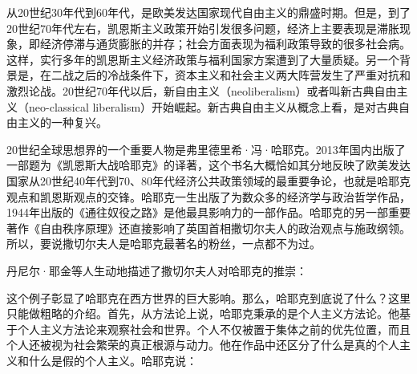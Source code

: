 
从20世纪30年代到60年代，是欧美发达国家现代自由主义的鼎盛时期。但是，到了20世纪70年代左右，凯恩斯主义政策开始引发很多问题，经济上主要表现是滞胀现象，即经济停滞与通货膨胀的并存；社会方面表现为福利政策导致的很多社会病。这样，实行多年的凯恩斯主义经济政策与福利国家方案遭到了大量质疑。另一个背景是，在二战之后的冷战条件下，资本主义和社会主义两大阵营发生了严重对抗和激烈论战。20世纪70年代以后，新自由主义（neoliberalism）或者叫新古典自由主义（neo-classical liberalism）开始崛起。新古典自由主义从概念上看，是对古典自由主义的一种复兴。

20世纪全球思想界的一个重要人物是弗里德里希·冯·哈耶克。2013年国内出版了一部题为《凯恩斯大战哈耶克》的译著，这个书名大概恰如其分地反映了欧美发达国家从20世纪40年代到70、80年代经济公共政策领域的最重要争论，也就是哈耶克观点和凯恩斯观点的交锋。哈耶克一生出版了为数众多的经济学与政治哲学作品，1944年出版的《通往奴役之路》是他最具影响力的一部作品。哈耶克的另一部重要著作《自由秩序原理》还直接影响了英国首相撒切尔夫人的政治观点与施政纲领。所以，要说撒切尔夫人是哈耶克最著名的粉丝，一点都不为过。

丹尼尔·耶金等人生动地描述了撒切尔夫人对哈耶克的推崇：


这个例子彰显了哈耶克在西方世界的巨大影响。那么，哈耶克到底说了什么？这里只能做粗略的介绍。首先，从方法论上说，哈耶克秉承的是个人主义方法论。他基于个人主义方法论来观察社会和世界。个人不仅被置于集体之前的优先位置，而且个人还被视为社会繁荣的真正根源与动力。他在作品中还区分了什么是真的个人主义和什么是假的个人主义。哈耶克说：


